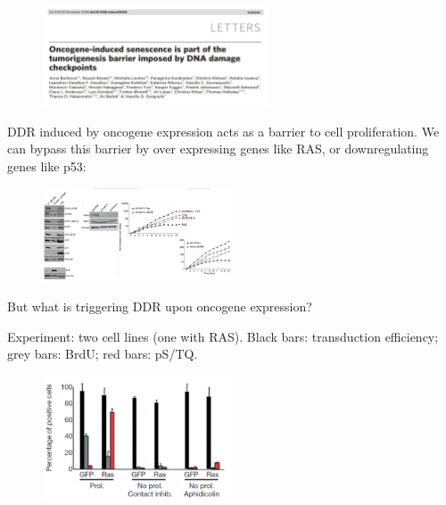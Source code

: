 \begin{figure}[h!]
\centering
\includegraphics[width=0.6\textwidth]{../_resources/76f900cd20da07b3fcbf3ae29e21596b.png} 
\label{fig:senescence1}
\end{figure}

DDR induced by oncogene expression acts as a barrier to cell proliferation.
We can bypass this barrier by over expressing genes like RAS, or
downregulating genes like p53:

\begin{figure}[h!]
\centering
\includegraphics[width=0.5\textwidth]{../_resources/b0a12e30eb68712a5f227c5bff2c9424.png} 
\label{fig:senescence2}
\end{figure}

But what is triggering DDR upon oncogene expression?

Experiment: two cell lines (one with RAS). Black bars: transduction
efficiency; grey bars: BrdU; red bars: pS/TQ.

\begin{figure}[h!]
\centering
\includegraphics[width=0.5\textwidth]{../_resources/f78ec4683d1e9e77bb74c4f6a372ac8b.png}  
\label{fig:senescence}
\end{figure}

